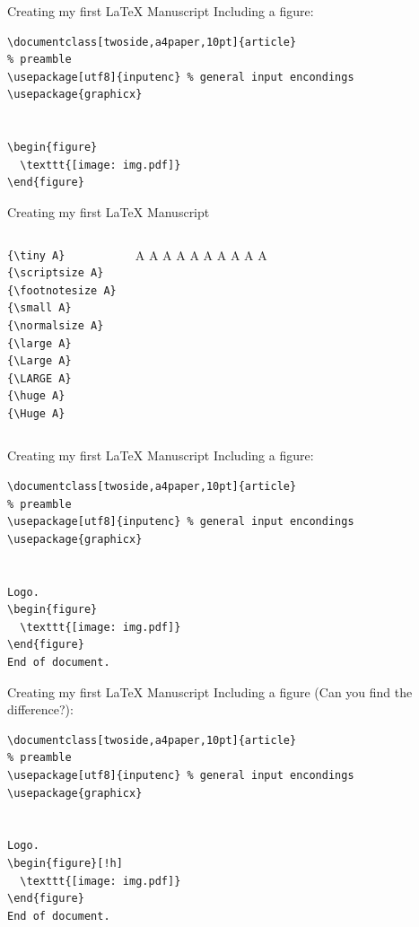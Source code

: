 \begin{frame}[fragile]{Creating my first \LaTeX{} Manuscript}
Including a figure:
\footnotesize
\begin{verbatim}
\documentclass[twoside,a4paper,10pt]{article}
% preamble
\usepackage[utf8]{inputenc} % general input encondings
\usepackage{graphicx}


\begin{figure}
  \texttt{[image: img.pdf]}
\end{figure}

\end{verbatim}
\end{frame}

\begin{frame}[fragile]{Creating my first \LaTeX{} Manuscript}
\begin{columns}[c]
\column{1.5in}
\begin{verbatim}
{\tiny A}
{\scriptsize A}
{\footnotesize A}
{\small A}
{\normalsize A}
{\large A}
{\Large A}
{\LARGE A}
{\huge A}
{\Huge A}
\end{verbatim}
\column{2.5in}
{\tiny A}
{\scriptsize A}
{\footnotesize A}
{\small A}
{\normalsize A}
{\large A}
{\Large A}
{\LARGE A}
{\huge A}
{\Huge A}
\end{columns}
\end{frame}


\begin{frame}[fragile]{Creating my first \LaTeX{} Manuscript}
Including a figure:
\footnotesize
\begin{verbatim}
\documentclass[twoside,a4paper,10pt]{article}
% preamble
\usepackage[utf8]{inputenc} % general input encondings
\usepackage{graphicx}


Logo.
\begin{figure}
  \texttt{[image: img.pdf]}
\end{figure}
End of document.

\end{verbatim}
\end{frame}

\begin{frame}[fragile]{Creating my first \LaTeX{} Manuscript}
Including a figure (Can you find the difference?):
\footnotesize
\begin{verbatim}
\documentclass[twoside,a4paper,10pt]{article}
% preamble
\usepackage[utf8]{inputenc} % general input encondings
\usepackage{graphicx}


Logo.
\begin{figure}[!h]
  \texttt{[image: img.pdf]}
\end{figure}
End of document.

\end{verbatim}
\end{frame}

